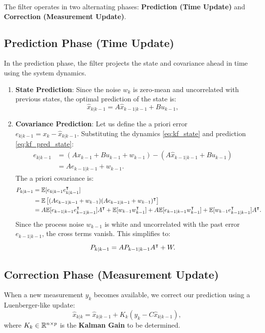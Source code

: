 The filter operates in two alternating phases: \textbf{Prediction (Time Update)} and \textbf{Correction (Measurement Update)}.

\subsection{Prediction Phase (Time Update)}
In the prediction phase, the filter projects the state and covariance ahead in time using the system dynamics.
\begin{enumerate}
    \item \textbf{State Prediction}:
    Since the noise $w_k$ is zero-mean and uncorrelated with previous states, the optimal prediction of the state is:
    \begin{equation}
        \hat{x}_{k|k-1} = A \hat{x}_{k-1|k-1} + B u_{k-1} , \label{eq:kf_pred_state}
    \end{equation}
    \item \textbf{Covariance Prediction}:
    Let us define the a priori error $e_{k|k-1} = x_k - \hat{x}_{k|k-1}$. Substituting the dynamics \eqref{eq:kf_state} and prediction \eqref{eq:kf_pred_state}:
    \begin{align}
        e_{k|k-1} &= (A x_{k-1} + B u_{k-1} + w_{k-1}) - (A \hat{x}_{k-1|k-1} + B u_{k-1}) \nonumber \\
&= A e_{k-1|k-1} + w_{k-1} .
    \end{align}
    The a priori covariance is:
    \begin{align}
        P_{k|k-1} &= \mathbb{E}[e_{k|k-1} e_{k|k-1}^\intercal] \nonumber \\
        &= \mathbb{E}\left[ (A e_{k-1|k-1} + w_{k-1})(A e_{k-1|k-1} + w_{k-1})^\intercal \right] \nonumber \\
&= A \mathbb{E}[e_{k-1|k-1} e_{k-1|k-1}^\intercal] A^\intercal + \mathbb{E}[w_{k-1} w_{k-1}^\intercal] + A \mathbb{E}[e_{k-1|k-1} w_{k-1}^\intercal] + \mathbb{E}[w_{k-1} e_{k-1|k-1}^\intercal] A^\intercal .
    \end{align}
    Since the process noise $w_{k-1}$ is white and uncorrelated with the past error $e_{k-1|k-1}$, the cross terms vanish. This simplifies to:
    \begin{equation}
        P_{k|k-1} = A P_{k-1|k-1} A^\intercal + W . \label{eq:kf_pred_cov}
    \end{equation}
\end{enumerate}

\subsection{Correction Phase (Measurement Update)}
When a new measurement $y_k$ becomes available, we correct our prediction using a Luenberger-like update:
\begin{equation}
    \hat{x}_{k|k} = \hat{x}_{k|k-1} + K_k \left( y_k - C \hat{x}_{k|k-1} \right) , \label{eq:kf_corr_state}
\end{equation}
where $K_k \in \mathbb{R}^{n \times p}$ is the \textbf{Kalman Gain} to be determined.

